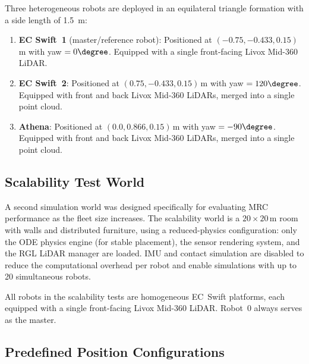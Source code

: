 
Three heterogeneous robots are deployed in an equilateral triangle
formation with a side length of \SI{1.5}{\metre}:
\begin{enumerate}
    \item \textbf{EC Swift~1} (master/reference robot):
          Positioned at $(-0.75, -0.433, 0.15)$\,m with yaw $= 0\degree$.
          Equipped with a single front-facing Livox Mid-360 LiDAR.
    \item \textbf{EC Swift~2}:
          Positioned at $(0.75, -0.433, 0.15)$\,m with yaw $= 120\degree$.
          Equipped with front and back Livox Mid-360 LiDARs, merged
          into a single point cloud.
    \item \textbf{Athena}:
          Positioned at $(0.0, 0.866, 0.15)$\,m with yaw $= -90\degree$.
          Equipped with front and back Livox Mid-360 LiDARs, merged
          into a single point cloud.
\end{enumerate}

\subsection{Scalability Test World}
\label{sec:scale_world}

A second simulation world was designed specifically for evaluating
MRC performance as the fleet size increases.
The scalability world is a $20 \times 20$\,m room with walls and
distributed furniture, using a reduced-physics configuration: only
the ODE physics engine (for stable placement), the sensor rendering
system, and the RGL LiDAR manager are loaded.
IMU and contact simulation are disabled to reduce the computational
overhead per robot and enable simulations with up to 20 simultaneous
robots.

All robots in the scalability tests are homogeneous EC~Swift platforms,
each equipped with a single front-facing Livox Mid-360 LiDAR.
Robot~0 always serves as the master.

\subsection{Predefined Position Configurations}
\label{sec:position_configs}


